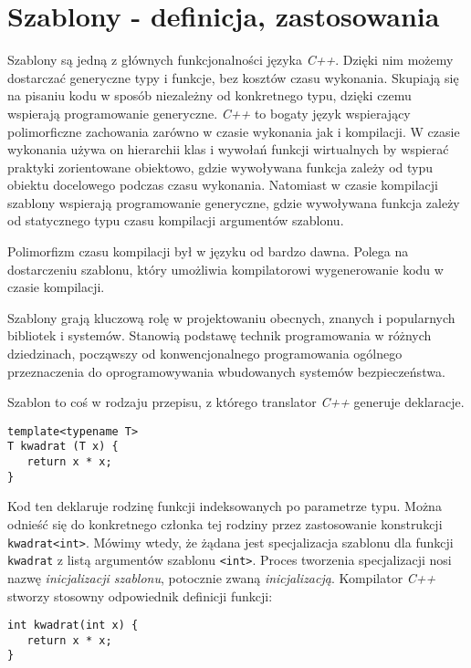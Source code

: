 \documentclass[11pt, a4paper]{article}
\begin{document}
\lstset{language=C++}

\section{Szablony - definicja, zastosowania}
Szablony są jedną z głównych funkcjonalności języka \emph{C++}. Dzięki nim możemy dostarczać generyczne typy i funkcje, bez kosztów czasu wykonania. Skupiają się na pisaniu kodu w sposób niezależny od konkretnego typu, dzięki czemu wspierają programowanie generyczne. \emph{C++} to bogaty język wspierający polimorficzne zachowania zarówno w czasie wykonania jak i kompilacji. W czasie wykonania używa on hierarchii klas i wywołań funkcji wirtualnych by wspierać praktyki zorientowane obiektowo, gdzie wywoływana funkcja zależy od typu obiektu docelowego podczas czasu wykonania. Natomiast w czasie kompilacji szablony wspierają programowanie generyczne, gdzie wywoływana funkcja zależy od statycznego typu czasu kompilacji argumentów szablonu.

Polimorfizm czasu kompilacji był w języku od bardzo dawna. Polega na dostarczeniu szablonu, który umożliwia kompilatorowi wygenerowanie kodu w czasie kompilacji.

Szablony grają kluczową rolę w projektowaniu obecnych, znanych i popularnych bibliotek i systemów. Stanowią podstawę technik programowania w różnych dziedzinach, począwszy od konwencjonalnego programowania ogólnego przeznaczenia do oprogramowywania wbudowanych systemów bezpieczeństwa.

Szablon to coś w rodzaju przepisu, z którego translator \emph{C++} generuje deklaracje.

\begin{lstlisting}[frame=single]
template<typename T>
T kwadrat (T x) {
   return x * x;
}
\end{lstlisting}

Kod ten deklaruje rodzinę funkcji indeksowanych po parametrze typu. Można odnieść się do konkretnego członka tej rodziny przez zastosowanie konstrukcji \verb#kwadrat<int>#. Mówimy wtedy, że żądana jest specjalizacja szablonu dla funkcji \verb#kwadrat# z listą argumentów szablonu \verb#<int>#. Proces tworzenia specjalizacji nosi nazwę \emph{inicjalizacji szablonu}, potocznie zwaną \emph{inicjalizacją}. Kompilator \emph{C++} stworzy stosowny odpowiednik definicji funkcji:
\newpage

\begin{lstlisting}[frame=single]
int kwadrat(int x) {
   return x * x;
}
\end{lstlisting}
\end{document}
